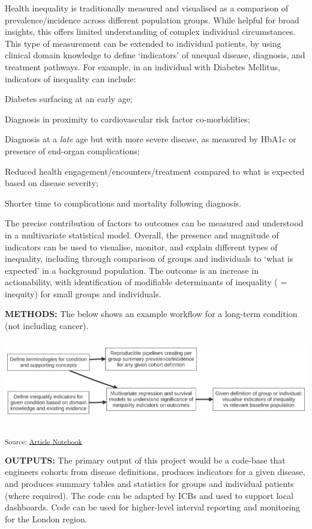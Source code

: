 \documentclass[
  letterpaper,
  DIV=11,
  numbers=noendperiod]{scrartcl}
\begin{document}
Health inequality is traditionally measured and visualised as a
comparison of prevalence/incidence across different population groups.
While helpful for broad insights, this offers limited understanding of
complex individual circumstances. This type of measurement can be
extended to individual patients, by using clinical domain knowledge to
define `indicators' of unequal disease, diagnosis, and treatment
pathways. For example, in an individual with Diabetes Mellitus,
indicators of inequality can include:

Diabetes surfacing at an early age;

Diagnosis in proximity to cardiovascular risk factor co-morbidities;

Diagnosis at a \emph{late} age but with more severe disease, as measured
by HbA1c or presence of end-organ complications;

Reduced health engagement/encounters/treatment compared to what is
expected based on disease severity;

Shorter time to complications and mortality following diagnosis.

The precise contribution of factors to outcomes can be measured and
understood in a multivariate statistical model. Overall, the presence
and magnitude of indicators can be used to visualise, monitor, and
explain different types of inequality, including through comparison of
groups and individuals to `what is expected' in a background population.
The outcome is an increase in actionability, with identification of
modifiable determinants of inequality ( = inequity) for small groups and
individuals.

\textbf{METHODS:} The below shows an example workflow for a long-term
condition (not including cancer).

\includegraphics[width=6in,height=1.41in]{index_files/figure-latex/mermaid-figure-5.png}

\textsubscript{Source:
\href{https://d3london.github.io/sde_aic_docs/index.qmd.html}{Article
Notebook}}

\textbf{OUTPUTS:} The primary output of this project would be a
code-base that engineers cohorts from disease definitions, produces
indicators for a given disease, and produces summary tables and
statistics for groups and individual patients (where required). The code
can be adapted by ICBs and used to support local dashboards. Code can be
used for higher-level interval reporting and monitoring for the London
region.
\end{document}
